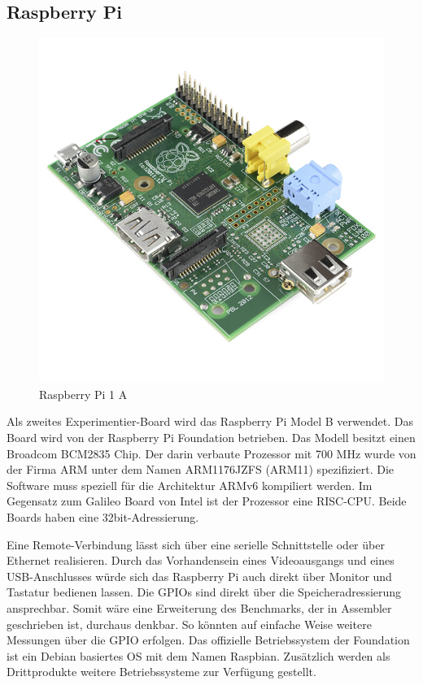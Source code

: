 \subsection{Raspberry Pi}


\begin{figure}
\centering
\includegraphics[scale=0.4]{images/raspberry-pi-2.png}
\caption{Raspberry Pi 1 A\cite{raspberry_image}}
\label{fig:Raspberry Pi 1 A}
\end{figure}


Als zweites Experimentier-Board wird das Raspberry Pi Model B\cite{raspberry_foundation} verwendet. Das Board wird von der Raspberry Pi Foundation betrieben. Das Modell besitzt einen Broadcom BCM2835\cite{broadcom_datasheet} Chip. Der darin verbaute Prozessor mit 700 MHz wurde von der Firma ARM unter dem Namen ARM1176JZFS\cite{arm_datasheet} (ARM11) spezifiziert. Die Software muss speziell für die Architektur ARMv6 kompiliert werden. Im Gegensatz zum Galileo Board von Intel ist der Prozessor eine RISC-CPU. Beide Boards haben eine 32bit-Adressierung.
\par
Eine Remote-Verbindung lässt sich über eine serielle Schnittstelle oder über Ethernet realisieren. Durch das Vorhandensein eines Videoausgangs und eines USB-Anschlusses würde sich das Raspberry Pi auch direkt über Monitor und Tastatur bedienen lassen. Die GPIOs sind direkt über die Speicheradressierung ansprechbar. Somit wäre eine Erweiterung des Benchmarks, der in Assembler geschrieben ist, durchaus denkbar. So könnten auf einfache Weise weitere Messungen über die GPIO erfolgen. Das offizielle Betriebssystem der Foundation ist ein Debian basiertes OS mit dem Namen Raspbian. Zusätzlich werden als Drittprodukte weitere Betriebssysteme zur Verfügung gestellt. 











